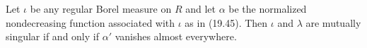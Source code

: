 Let $\iota$ be any regular Borel measure on $R$ and let $\alpha$ be the normalized nondecreasing function associated with $\iota$ as in (19.45). Then $\iota$ and $\lambda$ are mutually singular if and only if $\alpha'$ vanishes almost everywhere.